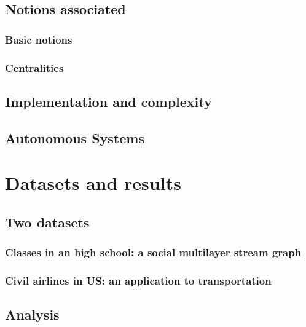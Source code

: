 \documentclass{svproc}
\begin{document}
   
\subsection{Notions associated}
%
\subsubsection{Basic notions}
%


\subsubsection{Centralities}
%
\subsection{Implementation and complexity}
%
\subsection{Autonomous Systems}
%

\section{Datasets and results}
%
\subsection{Two datasets}
%
\subsubsection{Classes in an high school: a social multilayer stream graph}
%
\subsubsection{Civil airlines in US: an application to transportation}
%
\subsection{Analysis}
%
\end{document}
